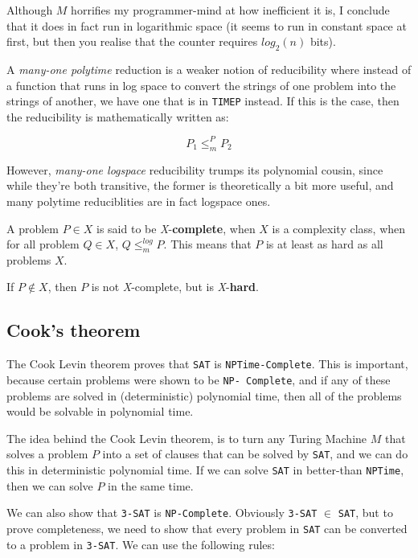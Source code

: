 Although $M$ horrifies my programmer-mind at how inefficient it is, I conclude
that it does in fact run in logarithmic space (it seems to run in constant space
at first, but then you realise that the counter requires $log_2(n)$ bits).

A \textit{many-one polytime} reduction is a weaker notion of reducibility where
instead of a function that runs in log space to convert the strings of one
problem into the strings of another, we have one that is in \texttt{TIME{P}}
instead. If this is the case, then the reducibility is mathematically written
as:

\[
  P_1 \leq_m^P P_2
\]


However, \textit{many-one logspace} reducibility trumps its polynomial cousin,
since while they're both transitive, the former is theoretically a bit more
useful, and many polytime reduciblities are in fact logspace ones.

A problem $P \in X$ is said to be \textit{X}-\textbf{complete}, when $X$ is a
complexity class, when for all problem $Q \in X$, $Q \leq_m^{log} P$. This means
that $P$ is at least as hard as all problems $X$.

If $P \notin X$, then $P$ is not \textit{X}-complete, but is
\textit{X}-\textbf{hard}.

\subsection{Cook's theorem}

The Cook Levin theorem proves that \texttt{SAT} is \texttt{NPTime-Complete}.
This is important, because certain problems were shown to be \texttt{NP-
Complete}, and if any of these problems are solved in (deterministic) polynomial
time, then all of the problems would be solvable in polynomial time.

The idea behind the Cook Levin theorem, is to turn any Turing Machine $M$ that
solves a problem $P$ into a set of clauses that can be solved by \texttt{SAT},
and we can do this in deterministic polynomial time. If we can solve
\texttt{SAT} in better-than \texttt{NPTime}, then we can solve $P$ in the same
time.

We can also show that \texttt{3-SAT} is \texttt{NP-Complete}. Obviously
\texttt{3-SAT} $\in$ \texttt{SAT}, but to prove completeness, we need to show
that every problem in \texttt{SAT} can be converted to a problem in
\texttt{3-SAT}. We can use the following rules:

